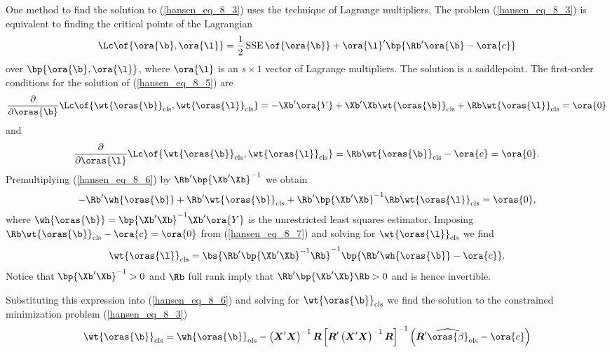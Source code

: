 One method to find the solution to (\ref{hansen_eq_8_3}) uses the technique of Lagrange multipliers. The problem (\ref{hansen_eq_8_3}) is equivalent to finding the critical points of the Lagrangian
\begin{equation}
    \label{hansen_eq_8_5}
    \Lc\of{\ora{\b}, \ora{\l}} = \frac{1}{2} \operatorname*{SSE}\of{\ora{\b}} + \ora{\l}^\prime \bp{\Rb^\prime \ora{\b} - \ora{c}}
\end{equation}
over $\bp{\ora{\b}, \ora{\l}}$, where $\ora{\l}$ is an $s \times 1$ vector of Lagrange multipliers. The solution is a saddlepoint. The first-order conditions for the solution of (\ref{hansen_eq_8_5}) are 
\begin{equation}
    \label{hansen_eq_8_6}
    \frac{\partial}{\partial \oras{\b}} \Lc\of{\wt{\oras{\b}}_{\text{cls}}, \wt{\oras{\l}}_{\text{cls}}} = - \Xb^\prime \ora{Y} + \Xb^\prime \Xb \wt{\oras{\b}}_{\text{cls}} + \Rb \wt{\oras{\l}}_{\text{cls}} = \ora{0}
\end{equation}
and 
\begin{equation}
    \label{hansen_eq_8_7}
    \frac{\partial}{\partial \oras{\l}} \Lc\of{\wt{\oras{\b}}_{\text{cls}}, \wt{\oras{\l}}_{\text{cls}}} = \Rb \wt{\oras{\b}}_{\text{cls}} - \ora{c} = \ora{0}.
\end{equation}
Premultiplying (\ref{hansen_eq_8_6}) by $\Rb^\prime \bp{\Xb^\prime \Xb}^{-1}$ we obtain 
\begin{equation}
    \notag
    - \Rb^\prime \wh{\oras{\b}} + \Rb^\prime \wt{\oras{\b}}_{\text{cls}} + \Rb^\prime \bp{\Xb^\prime \Xb}^{-1} \Rb \wt{\oras{\l}}_{\text{cls}} = \oras{0},
\end{equation}
where $\wh{\oras{\b}} = \bp{\Xb^\prime \Xb}^{-1} \Xb^\prime \ora{Y}$ is the unrestricted least squares estimator. Imposing $\Rb \wt{\oras{\b}}_{\text{cls}} - \ora{c} = \ora{0}$ from (\ref{hansen_eq_8_7}) and solving for $\wt{\oras{\l}}_{\text{cls}}$ we find 
\begin{equation}
    \notag
    \wt{\oras{\l}}_{\text{cls}} = \bs{\Rb^\prime \bp{\Xb^\prime \Xb}^{-1} \Rb}^{-1} \bp{\Rb^\prime \wh{\oras{\b}} - \ora{c}}.
\end{equation}
Notice that $\bp{\Xb^\prime \Xb}^{-1} > 0$ and $\Rb$ full rank imply that $\Rb^\prime \bp{\Xb^\prime \Xb} \Rb > 0$ and is hence invertible.

Substituting this expression into (\ref{hansen_eq_8_6}) and solving for $\wt{\oras{\b}}_{\text{cls}}$ we find the solution to the constrained minimization problem (\ref{hansen_eq_8_3})
\begin{equation}
    \label{hansen_eq_8_8}
    \wt{\oras{\b}}_{\text{cls}} = \wh{\oras{\b}}_{\text{ols}} - \left(\boldsymbol{X}^{\prime} \boldsymbol{X}\right)^{-1} \boldsymbol{R}\left[\boldsymbol{R}^{\prime}\left(\boldsymbol{X}^{\prime} \boldsymbol{X}\right)^{-1} \boldsymbol{R}\right]^{-1}\left(\boldsymbol{R}^{\prime} \widehat{\oras{\beta}}_{\mathrm{ols}}-\ora{c}\right)
\end{equation}

